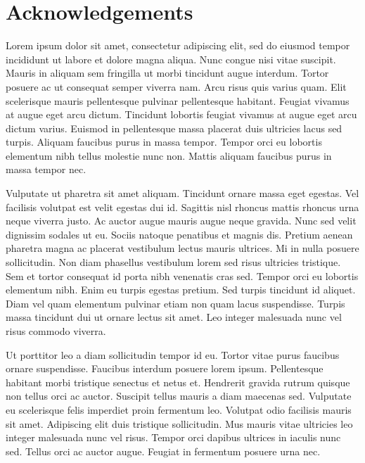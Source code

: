 \clearpage
\thispagestyle{plain}
\chapter*{Acknowledgements}
\begin{DoubleSpace}
Lorem ipsum dolor sit amet, consectetur adipiscing elit, sed do eiusmod tempor incididunt ut labore et dolore magna aliqua. Nunc congue nisi vitae suscipit. Mauris in aliquam sem fringilla ut morbi tincidunt augue interdum. Tortor posuere ac ut consequat semper viverra nam. Arcu risus quis varius quam. Elit scelerisque mauris pellentesque pulvinar pellentesque habitant. Feugiat vivamus at augue eget arcu dictum. Tincidunt lobortis feugiat vivamus at augue eget arcu dictum varius. Euismod in pellentesque massa placerat duis ultricies lacus sed turpis. Aliquam faucibus purus in massa tempor. Tempor orci eu lobortis elementum nibh tellus molestie nunc non. Mattis aliquam faucibus purus in massa tempor nec.

Vulputate ut pharetra sit amet aliquam. Tincidunt ornare massa eget egestas. Vel facilisis volutpat est velit egestas dui id. Sagittis nisl rhoncus mattis rhoncus urna neque viverra justo. Ac auctor augue mauris augue neque gravida. Nunc sed velit dignissim sodales ut eu. Sociis natoque penatibus et magnis dis. Pretium aenean pharetra magna ac placerat vestibulum lectus mauris ultrices. Mi in nulla posuere sollicitudin. Non diam phasellus vestibulum lorem sed risus ultricies tristique. Sem et tortor consequat id porta nibh venenatis cras sed. Tempor orci eu lobortis elementum nibh. Enim eu turpis egestas pretium. Sed turpis tincidunt id aliquet. Diam vel quam elementum pulvinar etiam non quam lacus suspendisse. Turpis massa tincidunt dui ut ornare lectus sit amet. Leo integer malesuada nunc vel risus commodo viverra.

Ut porttitor leo a diam sollicitudin tempor id eu. Tortor vitae purus faucibus ornare suspendisse. Faucibus interdum posuere lorem ipsum. Pellentesque habitant morbi tristique senectus et netus et. Hendrerit gravida rutrum quisque non tellus orci ac auctor. Suscipit tellus mauris a diam maecenas sed. Vulputate eu scelerisque felis imperdiet proin fermentum leo. Volutpat odio facilisis mauris sit amet. Adipiscing elit duis tristique sollicitudin. Mus mauris vitae ultricies leo integer malesuada nunc vel risus. Tempor orci dapibus ultrices in iaculis nunc sed. Tellus orci ac auctor augue. Feugiat in fermentum posuere urna nec.


\end{DoubleSpace}
